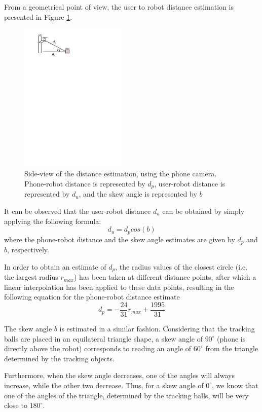 \documentclass[journal]{IEEEtran}
\let\MYoriglatexcaption\caption
\renewcommand{\caption}[2][\relax]{\MYoriglatexcaption[#2]{#2}}
\begin{document}
From a geometrical point of view, the user to robot distance estimation is presented in Figure \ref{fig:dist_camera}.
\begin{figure}[!htpb]
\centering
\includegraphics[width=2in]{images/distance_meas}
\caption{Side-view of the distance estimation, using the phone camera. Phone-robot distance is represented by $d_p$, user-robot distance is represented by $d_u$, and the skew angle is represented by $b$}
\label{fig:dist_camera}
\end{figure}

It can be observed that the user-robot distance $d_u$ can be obtained by simply applying the following formula:
\begin{equation}
d_u=d_pcos(b)
\label{eq:dist_estim}
\end{equation}
where the phone-robot distance and the skew angle estimates are given by $d_p$ and $b$, respectively.

In order to obtain an estimate of $d_p$, the radius values of the closest circle (i.e. the largest radius $r_{max}$) has been taken at different distance points, after which a linear interpolation has been applied to these data points, resulting in the following equation for the phone-robot distance estimate
\begin{equation}
d_p=-\frac{24}{31}r_{max}+\frac{1995}{31}
\end{equation}

The skew angle $b$ is estimated in a similar fashion. Considering that the tracking balls are placed in an equilateral triangle shape, a skew angle of $90^{\circ}$ (phone is directly above the robot) corresponds to reading an angle of $60^{\circ}$ from the triangle determined by the tracking objects.

Furthermore, when the skew angle decreases, one of the angles will always increase, while the other two decrease. Thus, for a skew angle of $0^{\circ}$, we know that one of the angles of the triangle, determined by the tracking balls, will be very close to $180^{\circ}$.
\end{document}
